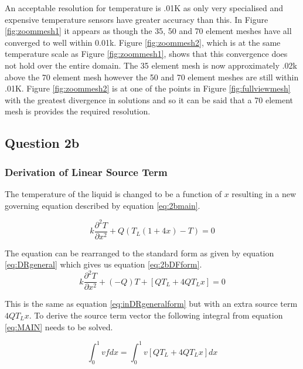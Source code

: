 \documentclass[11pt]{article}
\begin{document}
An acceptable resolution for temperature is .01K as only very specialised and expensive temperature sensors have greater accuracy than this. In Figure \ref{fig:zoommesh1} it appears as though the 35, 50 and 70 element meshes have all converged to well within 0.01k. Figure \ref{fig:zoommesh2}, which is at the same temperature scale as Figure \ref{fig:zoommesh1}, shows that this convergence does not hold over the entire domain. The 35 element mesh is now approximately .02k above the 70 element mesh however the 50 and 70 element meshes are still within .01K. Figure \ref{fig:zoommesh2} is at one of the points in Figure \ref{fig:fullviewmesh} with the greatest divergence in solutions and so it can be said that a 70 element mesh is provides the required resolution.

\clearpage

\subsection{Question 2b}

\subsubsection{Derivation of Linear Source Term}

The temperature of the liquid is changed to be a function of $x$  resulting in a new governing equation described by equation \ref{eq:2bmain}.

\begin{equation} \label{eq:2bmain}
k \frac{\partial^2 T}{\partial x^2} + Q(T_L(1 + 4x) - T) = 0
\end{equation}



The equation can be rearranged to the standard form as given by equation \ref{eq:DRgeneral} which gives us equation \ref{eq:2bDFform}.
\begin{equation}
\label{eq:2bDFform}
k \frac{\partial^2 T}{\partial x^2} + (-Q)T + \left [ QT_L + 4QT_Lx \right ] = 0
\end{equation}

This is the same as equation \ref{eq:inDRgeneralform} but with an extra source term $4QT_Lx$. To derive the source term vector the following integral from equation \ref{eq:MAIN} needs to be solved.

\begin{equation*}
\int_{0}^{1}vf dx = \int_{0}^{1}v\left [ QT_L + 4QT_Lx \right ] dx
\end{equation*}
\end{document}
